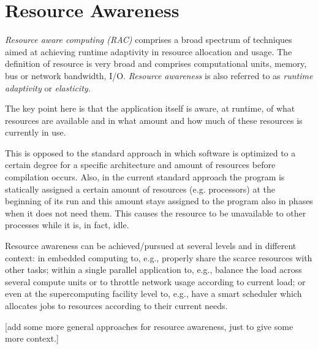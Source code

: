 
\section{Resource Awareness}

\emph{Resource aware computing (RAC)} comprises a broad spectrum of techniques aimed at achieving runtime adaptivity in resource allocation and usage. The definition of resource is very broad and comprises computational units, memory, bus or network bandwidth, I/O.
\emph{Resource awareness} is also referred to as \emph{runtime adaptivity} or \emph{elasticity}.

The key point here is that the application itself is aware, at runtime, of what resources are available and in what amount and how much of these resources is currently in use.

This is opposed to the standard approach in which software is optimized to a certain degree for a specific architecture and amount of resources before compilation occurs.
Also, in the current standard approach the program is statically assigned a certain amount of resources (e.g. processors) at the beginning of its run and this amount stays assigned to the program also in phases when it does not need them. This causes the resource to be unavailable to other processes while it is, in fact, idle.

Resource awareness can be achieved/pursued  at several levels and in different context: in embedded computing to, e.g., properly share the scarce resources with other tasks; within a single parallel application to, e.g., balance the load across several compute units or to throttle network usage according to current load; or even at the supercomputing facility level to, e.g., have a smart scheduler which allocates jobs to resources according to their current needs.

[\TODO add some more general approaches for resource awareness, just to give some more context.]


